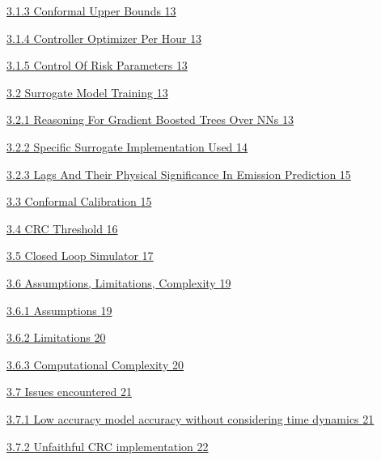 \documentclass[11pt]{article}
\begin{document}
\hyperref[conformal-upper-bounds]{3.1.3 Conformal Upper Bounds
\hyperref[conformal-upper-bounds]{13}}

\hyperref[controller-optimizer-per-hour]{3.1.4 Controller Optimizer Per
Hour \hyperref[controller-optimizer-per-hour]{13}}

\hyperref[control-of-risk-parameters]{3.1.5 Control Of Risk Parameters
\hyperref[control-of-risk-parameters]{13}}

\hyperref[surrogate-model-training]{3.2 Surrogate Model Training
\hyperref[surrogate-model-training]{13}}

\hyperref[reasoning-for-gradient-boosted-trees-over-nns]{3.2.1 Reasoning
For Gradient Boosted Trees Over NNs
\hyperref[reasoning-for-gradient-boosted-trees-over-nns]{13}}

\hyperref[specific-surrogate-implementation-used]{3.2.2 Specific
Surrogate Implementation Used
\hyperref[specific-surrogate-implementation-used]{14}}

\hyperref[lags-and-their-physical-significance-in-emission-prediction]{3.2.3
Lags And Their Physical Significance In Emission Prediction
\hyperref[lags-and-their-physical-significance-in-emission-prediction]{15}}

\hyperref[conformal-calibration]{3.3 Conformal Calibration
\hyperref[conformal-calibration]{15}}

\hyperref[crc-threshold]{3.4 CRC Threshold \hyperref[crc-threshold]{16}}

\hyperref[closed-loop-simulator]{3.5 Closed Loop Simulator
\hyperref[closed-loop-simulator]{17}}

\hyperref[assumptions-limitations-complexity]{3.6 Assumptions,
Limitations, Complexity
\hyperref[assumptions-limitations-complexity]{19}}

\hyperref[assumptions]{3.6.1 Assumptions \hyperref[assumptions]{19}}

\hyperref[limitations]{3.6.2 Limitations \hyperref[limitations]{20}}

\hyperref[computational-complexity]{3.6.3 Computational Complexity
\hyperref[computational-complexity]{20}}

\hyperref[issues-encountered]{3.7 Issues encountered
\hyperref[issues-encountered]{21}}

\hyperref[low-model-accuracy-without-considering-time-dynamics]{3.7.1
Low accuracy model accuracy without considering time dynamics
\hyperref[low-model-accuracy-without-considering-time-dynamics]{21}}

\hyperref[unfaithful-crc-implementation]{3.7.2 Unfaithful CRC
implementation \hyperref[unfaithful-crc-implementation]{22}}
\end{document}
